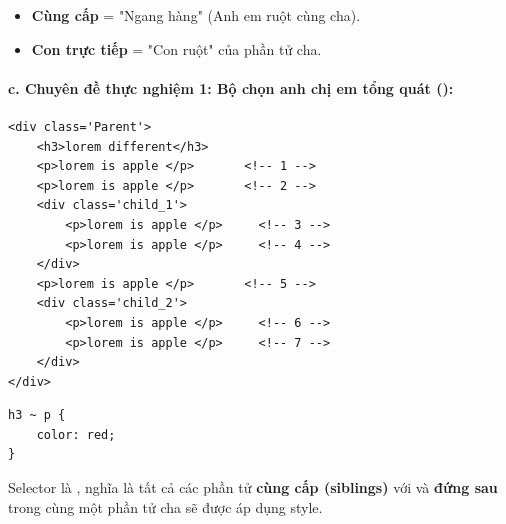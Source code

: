 \begin{tipBox}
\begin{itemize}[leftmargin=1.5em, itemsep=3pt, parsep=0pt]
    \item \textbf{Cùng cấp} = "Ngang hàng" (Anh em ruột cùng cha).
    \item \textbf{Con trực tiếp} = "Con ruột" của phần tử cha.
\end{itemize}
\end{tipBox}

\paragraph{c. Chuyên đề thực nghiệm 1: Bộ chọn anh chị em tổng quát ():}

\begin{codeWindow}
\begin{lstlisting}[language=HTML5]
<div class='Parent'>
    <h3>lorem different</h3>
    <p>lorem is apple </p>       <!-- 1 -->
    <p>lorem is apple </p>       <!-- 2 -->
    <div class='child_1'>
        <p>lorem is apple </p>     <!-- 3 -->
        <p>lorem is apple </p>     <!-- 4 -->
    </div>
    <p>lorem is apple </p>       <!-- 5 -->
    <div class='child_2'>
        <p>lorem is apple </p>     <!-- 6 -->
        <p>lorem is apple </p>     <!-- 7 -->
    </div>
</div>
\end{lstlisting}

\begin{lstlisting}[language=CSS3]
h3 ~ p {
    color: red;
}
\end{lstlisting}
\end{codeWindow}

\begin{conceptBox}
Selector  là , nghĩa là tất cả các phần tử  \textbf{cùng cấp (siblings)} với  và \textbf{đứng sau}  trong cùng một phần tử cha sẽ được áp dụng style.
\end{conceptBox}

